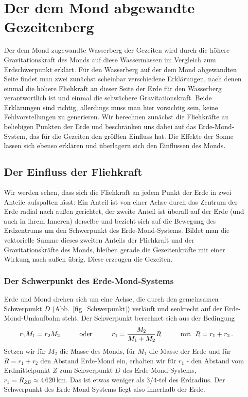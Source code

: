 \section{Der dem Mond abgewandte Gezeitenberg}

Der dem Mond zugewandte Wasserberg der Gezeiten wird durch die h\"ohere Gravitationskraft 
des Monds auf diese Wassermassen im Vergleich zum Erdschwerpunkt erkl\"art.
F\"ur den Wasserberg auf der dem Mond abgewandten Seite findet man zwei zun\"achst scheinbar 
verschiedene Erkl\"arungen, nach denen einmal die h\"ohere Fliehkraft an dieser Seite der Erde f\"ur den
Wasserberg verantwortlich ist und einmal die schw\"achere Gravitationskraft. Beide Erkl\"arungen sind
richtig, allerdings muss man hier vorsichtig sein, keine Fehlvorstellungen zu generieren.
Wir berechnen zun\"achst die Fliehkr\"afte an beliebigen Punkten der Erde und 
beschr\"anken uns dabei auf das Erde-Mond-System, das f\"ur die Gezeiten den gr\"o\ss ten
Einfluss hat. Die Effekte der Sonne lassen sich ebenso erkl\"aren und \"uberlagern sich den
Einfl\"ussen des Monds.

\subsection{Der Einfluss der Fliehkraft}

Wir werden sehen, dass sich die Fliehkraft an jedem Punkt der Erde in zwei Anteile aufspalten
l\"asst: Ein Anteil ist von einer Achse durch das Zentrum der Erde radial nach au\ss en gerichtet, der
zweite Anteil ist \"uberall auf der Erde (und auch in ihrem Inneren) derselbe und bezieht sich
auf die Bewegung des Erdzentrums um den Schwerpunkt des Erde-Mond-Systems. Bildet man die
vektorielle Summe dieses zweiten Anteils der Fliehkraft und der Gravitationskr\"afte des Monds, bleiben
gerade die Gezeitenkr\"afte mit einer Wirkung nach au\ss en \"ubrig. Diese erzeugen die Gezeiten.

\subsubsection{Der Schwerpunkt des Erde-Mond-Systems}

Erde und Mond drehen sich um eine Achse, die durch den gemeinsamen Schwerpunkt $D$
(Abb.\ \ref{fig_Schwerpunkt})
verl\"auft und senkrecht auf der Erde-Mond-Umlaufbahn steht. Der Schwerpunkt berechnet sich aus
der Bedingung
\begin{equation}
\label{eq_Schwerpunkt}
             r_1 M_1 = r_2 M_2  \hspace{1cm} {\rm oder} \hspace{1cm}  
                 r_1  = \frac{M_2}{M_1+M_2} R  \hspace{1cm} {\rm mit} ~~ R=r_1+r_2 \, .
\end{equation}
Setzen wir f\"ur $M_2$ die Masse des Monds, f\"ur $M_1$ die Masse der Erde und f\"ur
$R=r_1+r_2$ den Abstand Erde-Mond ein, erhalten wir f\"ur $r_1$ - den Abstand vom Erdmittelpunkt $Z$
zum Schwerpunkt $D$ des Erde-Mond-Systems, $r_1 = R_{ZD} \approx 4\,620$\,km. Das ist etwas weniger als
3/4-tel des Erdradius. Der Schwerpunkt des Erde-Mond-Systems liegt also innerhalb der Erde.   

